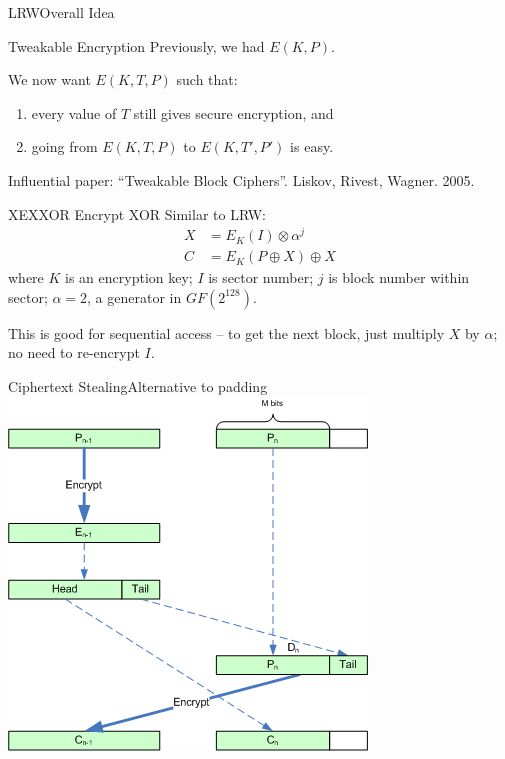 \documentclass[12pt]{beamer}
\begin{document}
\begin{frame}{LRW}{Overall Idea}
\begin{block}{Tweakable Encryption}
	Previously, we had $E(K, P)$.
	
	We now want $E(K, T, P)$ such that:\begin{enumerate}
		\item every value of $T$ still gives secure encryption, and
		\item going from $E(K, T, P)$ to $E(K, T', P')$ is easy.
	\end{enumerate}

	Influential paper: ``Tweakable Block Ciphers''. Liskov, Rivest, Wagner.
	2005.
\end{block}
\end{frame}

\begin{frame}{XEX}{XOR Encrypt XOR}
	Similar to LRW:
	\begin{align*}
		X &= E_K(I) \otimes \alpha^j \\
		C &= E_K(P \oplus X) \oplus X
	\end{align*}
	where $K$ is an encryption key;
	$I$ is sector number;
	$j$ is block number within sector;
	$\alpha = 2$, a generator in $GF(2^{128})$.

	This is good for sequential access -- to get the next block, just multiply
	$X$ by $\alpha$; no need to re-encrypt $I$.
\end{frame}

\begin{frame}{Ciphertext Stealing}{Alternative to padding}
	\centering
	\includegraphics[width=\textwidth, height=0.8\textheight, keepaspectratio=true]{pictures/CTS_ECB_Encryption.png}
\end{frame}
\end{document}
